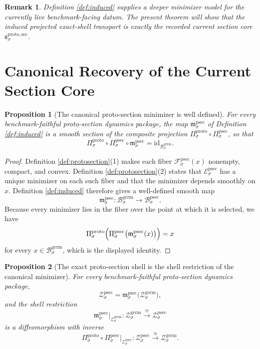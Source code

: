 \documentclass[11pt]{article}
\newcommand{\GermBody}[1]{\mathcal B_{#1}^{\mathrm{germ}}}
\newcommand{\GermShell}[1]{\mathcal Z_{#1}^{\mathrm{germ}}}
\newcommand{\ProtoProj}[1]{\Pi_{#1}^{\mathrm{proto}}}
\newcommand{\ProtoTransportSec}[1]{\mathfrak s_{#1}^{\mathrm{proto,sec}}}
\newcommand{\ProtoSectionBody}[1]{\mathcal B_{#1}^{\mathrm{psec}}}
\newcommand{\ProtoSectionProj}[1]{\Pi_{#1}^{\mathrm{psec}}}
\newcommand{\ProtoSectionFiber}[2]{\mathcal F_{#1}^{\mathrm{psec}}(#2)}
\newcommand{\ProtoSectionFunctional}[1]{\mathscr E_{#1}^{\mathrm{psec}}}
\newcommand{\ProtoSectionShell}[1]{\mathcal Z_{#1}^{\mathrm{psec}}}
\newcommand{\ProtoSectionMin}[1]{\mathfrak m_{#1}^{\mathrm{psec}}}
\newtheorem{proposition}{Proposition}
\newtheorem{remark}{Remark}
\begin{document}
\begin{remark}
Definition \ref{def:induced} supplies a deeper minimizer model for the currently live benchmark-facing datum. The present theorem will show that the induced projected exact-shell transport is exactly the recorded current section core \(\ProtoTransportSec{\sigma}\).
\end{remark}

\section{Canonical Recovery of the Current Section Core}

\begin{proposition}[The canonical proto-section minimizer is well defined]
\label{prop:minimizer}
For every benchmark-faithful proto-section dynamics package, the map \(\ProtoSectionMin{\sigma}\) of Definition \ref{def:induced} is a smooth section of the composite projection \(\ProtoProj{\sigma}\circ\ProtoSectionProj{\sigma}\), so that
\[
\ProtoProj{\sigma}\circ\ProtoSectionProj{\sigma}\circ\ProtoSectionMin{\sigma}
=
\mathrm{id}_{\GermBody{\sigma}}.
\]
\end{proposition}

\begin{proof}
Definition \ref{def:protosection}(1) makes each fiber \(\ProtoSectionFiber{\sigma}{x}\) nonempty, compact, and convex. Definition \ref{def:protosection}(2) states that \(\ProtoSectionFunctional{\sigma}\) has a unique minimizer on each such fiber and that the minimizer depends smoothly on \(x\). Definition \ref{def:induced} therefore gives a well-defined smooth map
\[
\ProtoSectionMin{\sigma}:\GermBody{\sigma}\to\ProtoSectionBody{\sigma}.
\]
Because every minimizer lies in the fiber over the point at which it is selected, we have
\[
\ProtoProj{\sigma}\Bigl(
\ProtoSectionProj{\sigma}\bigl(\ProtoSectionMin{\sigma}(x)\bigr)
\Bigr)=x
\]
for every \(x\in\GermBody{\sigma}\), which is the displayed identity.
\end{proof}

\begin{proposition}[The exact proto-section shell is the shell restriction of the canonical minimizer]
\label{prop:shell}
For every benchmark-faithful proto-section dynamics package,
\[
\ProtoSectionShell{\sigma}
=
\ProtoSectionMin{\sigma}\bigl(\GermShell{\sigma}\bigr),
\]
and the shell restriction
\[
\ProtoSectionMin{\sigma}\big|_{\GermShell{\sigma}}
:
\GermShell{\sigma}\xrightarrow{\cong}\ProtoSectionShell{\sigma}
\]
is a diffeomorphism with inverse
\[
\ProtoProj{\sigma}\circ\ProtoSectionProj{\sigma}\big|_{\ProtoSectionShell{\sigma}}
:
\ProtoSectionShell{\sigma}\xrightarrow{\cong}\GermShell{\sigma}.
\]
\end{proposition}
\end{document}
